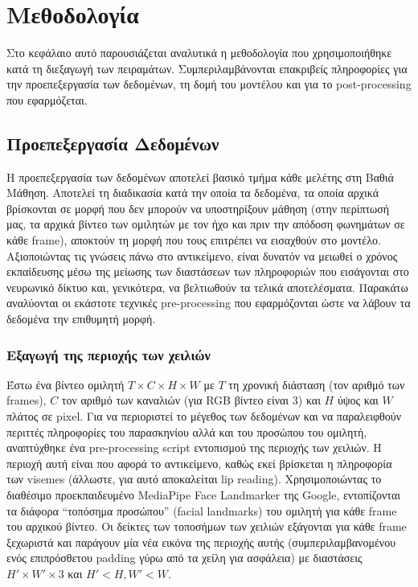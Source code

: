 \section{Μεθοδολογία}
\label{Methodology}

Στο κεφάλαιο αυτό παρουσιάζεται αναλυτικά η μεθοδολογία που χρησιμοποιήθηκε κατά τη διεξαγωγή των πειραμάτων. Συμπεριλαμβάνονται επακριβείς πληροφορίες για την προεπεξεργασία των δεδομένων, τη δομή του μοντέλου και για το post-processing που εφαρμόζεται.

\subsection{Προεπεξεργασία Δεδομένων}
\label{DataPreprocessing}

Η προεπεξεργασία των δεδομένων αποτελεί βασικό τμήμα κάθε μελέτης στη Βαθιά Μάθηση. Αποτελεί τη διαδικασία κατά την οποία τα δεδομένα, τα οποία αρχικά βρίσκονται σε μορφή που δεν μπορούν να υποστηρίξουν μάθηση (στην περίπτωσή μας, τα αρχικά βίντεο των ομιλητών με τον ήχο και πριν την απόδοση φωνημάτων σε κάθε frame), αποκτούν τη μορφή που τους επιτρέπει να εισαχθούν στο μοντέλο. Αξιοποιώντας τις γνώσεις πάνω στο αντικείμενο, είναι δυνατόν να μειωθεί ο χρόνος εκπαίδευσης μέσω της μείωσης των διαστάσεων των πληροφοριών που εισάγονται στο νευρωνικό δίκτυο και, γενικότερα, να βελτιωθούν τα τελικά αποτελέσματα. Παρακάτω αναλύονται οι εκάστοτε τεχνικές pre-processing που εφαρμόζονται ώστε να λάβουν τα δεδομένα την επιθυμητή μορφή.

\subsubsection{Εξαγωγή της περιοχής των χειλιών}
\label{LipExtraction}
Έστω ένα βίντεο ομιλητή $T \times C \times H \times W$ με $T$ τη χρονική διάσταση (τον αριθμό των frames), $C$ τον αριθμό των καναλιών (για RGB βίντεο είναι 3) και $H$ ύψος και $W$ πλάτος σε pixel. Για να περιοριστεί το μέγεθος των δεδομένων και να παραλειφθούν περιττές πληροφορίες του παρασκηνίου αλλά και του προσώπου του ομιλητή, αναπτύχθηκε ένα pre-processing script εντοπισμού της περιοχής των χειλιών. Η περιοχή αυτή είναι που αφορά το αντικείμενο, καθώς εκεί βρίσκεται η πληροφορία των visemes (άλλωστε, για αυτό αποκαλείται lip reading). Χρησιμοποιώντας το διαθέσιμο προεκπαιδευμένο MediaPipe Face Landmarker της Google, εντοπίζονται τα διάφορα ``τοπόσημα προσώπου'' (facial landmarks) του ομιλητή για κάθε frame του αρχικού βίντεο. Οι δείκτες των τοποσήμων των χειλιών εξάγονται για κάθε frame ξεχωριστά και παράγουν μία νέα εικόνα της περιοχής αυτής (συμπεριλαμβανομένου ενός επιπρόσθετου padding γύρω από τα χείλη για ασφάλεια) με διαστάσεις $H' \times W' \times 3$ και $H'<H, W'<W$.

